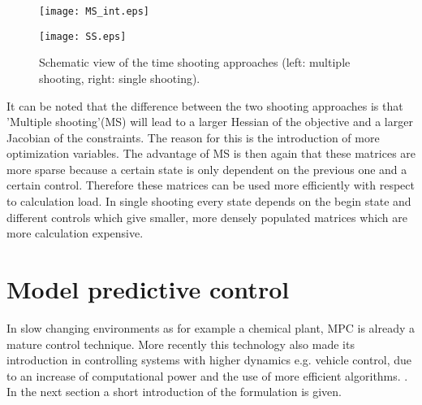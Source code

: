 \begin{figure}[htp]
	\centering
	\begin{minipage}{0.49\textwidth}
		\centering
		\texttt{[image: MS\_int.eps]}
	\end{minipage}
	\hfill
	\begin{minipage}{.49\textwidth}
		\centering
		\texttt{[image: SS.eps]}
	\end{minipage}
	\caption{Schematic view of the time shooting approaches (left: multiple shooting, right: single shooting).}
	\label{fig:TS}
\end{figure}

It can be noted that the difference between the two shooting approaches is that 'Multiple shooting'(MS) will lead to a larger Hessian of the objective and a larger Jacobian of the constraints. The reason for this is the introduction of more optimization variables. The advantage of MS is then again that these matrices are more sparse because a certain state is only dependent on the previous one and a certain control. Therefore these matrices can be used more efficiently with respect to calculation load. In single shooting every state depends on the begin state and different controls which give smaller, more densely populated matrices which are more calculation expensive. \cite{Gillis2019}

\section{Model predictive control}
\label{s:MPC_e}
In slow changing environments as for example a chemical plant, MPC is already a mature control technique. More recently this technology also made its introduction in controlling systems with higher dynamics e.g. vehicle control, due to an increase of computational power and the use of more efficient algorithms. \cite{Mercy2018}. In the next section a short introduction of the formulation is given. \\


